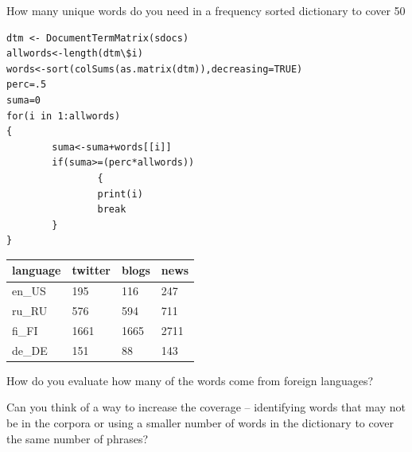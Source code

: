 \documentclass{article}
\begin{document}
How many unique words do you need in a frequency sorted dictionary to cover 50%

\begin{lstlisting}
dtm <- DocumentTermMatrix(sdocs)
allwords<-length(dtm\$i)
words<-sort(colSums(as.matrix(dtm)),decreasing=TRUE)
perc=.5
suma=0
for(i in 1:allwords)
{
        suma<-suma+words[[i]]
        if(suma>=(perc*allwords))
                {
                print(i)
                break
        }
}
\end{lstlisting}

\begin{center}
    \begin{tabular}{ | l | l | l | l |}
    \hline
    language & twitter & blogs & news \\ \hline
    en\_US &  195  & 116 &  247 \\ \hline
    ru\_RU &  576  & 594 &  711  \\ \hline
    fi\_FI &  1661 & 1665 & 2711  \\ \hline
    de\_DE &  151  & 88 &  143  \\ \hline
    \end{tabular}
\end{center}


How do you evaluate how many of the words come from foreign languages? 

Can you think of a way to increase the coverage -- identifying words that may not be in the corpora or using a smaller number of words in the dictionary to cover the same number of phrases?
\end{document}
